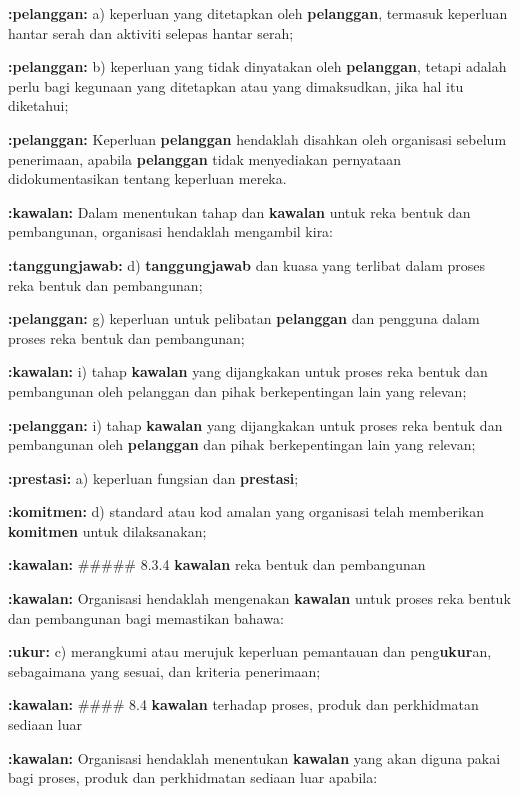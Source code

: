 \documentclass{article}
\begin{document}
\textbf{:pelanggan:} a) keperluan yang ditetapkan oleh \textbf{pelanggan}, termasuk keperluan hantar serah dan aktiviti
selepas hantar serah;

\textbf{:pelanggan:} b) keperluan yang tidak dinyatakan oleh \textbf{pelanggan}, tetapi adalah perlu bagi kegunaan yang
ditetapkan atau yang dimaksudkan, jika hal itu diketahui;

\textbf{:pelanggan:} Keperluan \textbf{pelanggan} hendaklah disahkan oleh organisasi sebelum penerimaan, apabila
\textbf{pelanggan} tidak menyediakan pernyataan didokumentasikan tentang keperluan mereka.

\textbf{:kawalan:} Dalam menentukan tahap dan \textbf{kawalan} untuk reka bentuk dan pembangunan, organisasi
hendaklah mengambil kira:

\textbf{:tanggungjawab:} d) \textbf{tanggungjawab} dan kuasa yang terlibat dalam proses reka bentuk dan pembangunan;

\textbf{:pelanggan:} g) keperluan untuk pelibatan \textbf{pelanggan} dan pengguna dalam proses reka bentuk dan
pembangunan;

\textbf{:kawalan:} i) tahap \textbf{kawalan} yang dijangkakan untuk proses reka bentuk dan pembangunan oleh
pelanggan dan pihak berkepentingan lain yang relevan;

\textbf{:pelanggan:} i) tahap \textbf{kawalan} yang dijangkakan untuk proses reka bentuk dan pembangunan oleh
\textbf{pelanggan} dan pihak berkepentingan lain yang relevan;

\textbf{:prestasi:} a) keperluan fungsian dan \textbf{prestasi};

\textbf{:komitmen:} d) standard atau kod amalan yang organisasi telah memberikan \textbf{komitmen} untuk
dilaksanakan;

\textbf{:kawalan:} \#\#\#\#\# 8.3.4 \textbf{kawalan} reka bentuk dan pembangunan

\textbf{:kawalan:} Organisasi hendaklah mengenakan \textbf{kawalan} untuk proses reka bentuk dan pembangunan
bagi memastikan bahawa:

\textbf{:ukur:} c) merangkumi atau merujuk keperluan pemantauan dan peng\textbf{ukur}an, sebagaimana yang
sesuai, dan kriteria penerimaan;

\textbf{:kawalan:} \#\#\#\# 8.4 \textbf{kawalan} terhadap proses, produk dan perkhidmatan sediaan luar

\textbf{:kawalan:} Organisasi hendaklah menentukan \textbf{kawalan} yang akan diguna pakai bagi proses, produk dan
perkhidmatan sediaan luar apabila:
\end{document}

